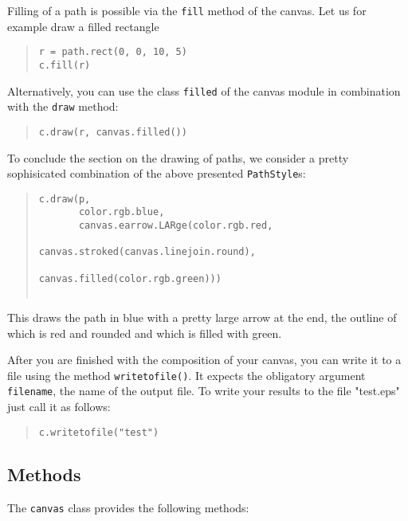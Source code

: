 Filling of a path is possible via the \verb|fill| method of the canvas.
Let us for example draw a filled rectangle 
\begin{quote}
\begin{verbatim}
r = path.rect(0, 0, 10, 5)
c.fill(r)
\end{verbatim}
\end{quote}
Alternatively, you can use the class \verb|filled| of the canvas module
in combination with the \verb|draw| method:
\begin{quote}
\begin{verbatim}
c.draw(r, canvas.filled())
\end{verbatim}
\end{quote}

To conclude the section on the drawing of paths, we consider a pretty
sophisicated combination of the above presented \verb|PathStyle|s:
\begin{quote}
\begin{verbatim}
c.draw(p, 
       color.rgb.blue, 
       canvas.earrow.LARge(color.rgb.red,
                           canvas.stroked(canvas.linejoin.round),
                                          canvas.filled(color.rgb.green)))
                                                              
\end{verbatim}
\end{quote}
This draws the path in blue with a pretty large arrow at the end, the outline
of which is red and rounded and which is filled with green.

After you are finished with the composition of your canvas, you can
write it to a file using the method \verb|writetofile()|. It expects the
obligatory argument \verb|filename|, the name of the output
file. To write your results to the file "test.eps" just call it as follows:
\begin{quote}
\begin{verbatim}
c.writetofile("test")
\end{verbatim}
\end{quote}


\subsection{Methods}



The \verb|canvas| class provides the following methods:

